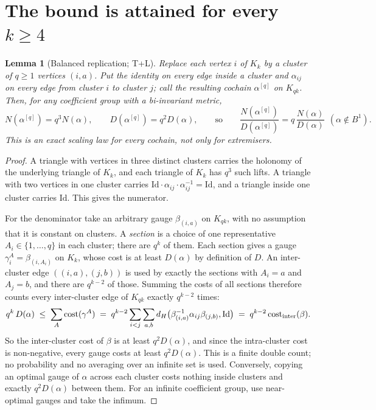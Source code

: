 \documentclass[11pt]{article}
\newtheorem{lemma}[theorem]{Lemma}
\theoremstyle{remark}\newtheorem{remark}[theorem]{Remark}
\newcommand{\Id}{\mathrm{Id}}\newcommand{\Tr}{\operatorname{Tr}}
\begin{document}
\section{The bound is attained for every \texorpdfstring{$k\ge4$}{k>=4}}\label{sec:all}
\begin{lemma}[Balanced replication; T+L]\label{lem:rep}
Replace each vertex $i$ of $K_k$ by a cluster of $q\ge1$ vertices $(i,a)$. Put the identity on every edge inside a cluster and $\alpha_{ij}$ on every edge from cluster $i$ to cluster $j$; call the resulting cochain $\alpha^{[q]}$ on $K_{qk}$. Then, for any coefficient group with a bi-invariant metric,
\[
N(\alpha^{[q]})=q^3N(\alpha),\qquad D(\alpha^{[q]})=q^2D(\alpha),\qquad\text{so}\qquad \frac{N(\alpha^{[q]})}{D(\alpha^{[q]})}=q\,\frac{N(\alpha)}{D(\alpha)}\ \ (\alpha\notin B^1).
\]
This is an exact scaling law for every cochain, not only for extremisers.
\end{lemma}
\begin{proof}
A triangle with vertices in three distinct clusters carries the holonomy of the underlying triangle of $K_k$, and each triangle of $K_k$ has $q^3$ such lifts. A triangle with two vertices in one cluster carries $\Id\cdot\alpha_{ij}\cdot\alpha_{ij}^{-1}=\Id$, and a triangle inside one cluster carries $\Id$. This gives the numerator.

For the denominator take an arbitrary gauge $\beta_{(i,a)}$ on $K_{qk}$, with no assumption that it is constant on clusters. A \emph{section} is a choice of one representative $A_i\in\{1,\dots,q\}$ in each cluster; there are $q^k$ of them. Each section gives a gauge $\gamma^A_i=\beta_{(i,A_i)}$ on $K_k$, whose cost is at least $D(\alpha)$ by definition of $D$. An inter-cluster edge $((i,a),(j,b))$ is used by exactly the sections with $A_i=a$ and $A_j=b$, and there are $q^{k-2}$ of those. Summing the costs of all sections therefore counts every inter-cluster edge of $K_{qk}$ exactly $q^{k-2}$ times:
\[
q^k\,D(\alpha)\;\le\;\sum_{A}\mathrm{cost}(\gamma^A)\;=\;q^{k-2}\sum_{i<j}\sum_{a,b}\dH\big(\beta_{(i,a)}^{-1}\alpha_{ij}\beta_{(j,b)},\Id\big)\;=\;q^{k-2}\,\mathrm{cost}_{\rm inter}(\beta).
\]
So the inter-cluster cost of $\beta$ is at least $q^2D(\alpha)$, and since the intra-cluster cost is non-negative, every gauge costs at least $q^2D(\alpha)$. This is a finite double count; no probability and no averaging over an infinite set is used. Conversely, copying an optimal gauge of $\alpha$ across each cluster costs nothing inside clusters and exactly $q^2D(\alpha)$ between them. For an infinite coefficient group, use near-optimal gauges and take the infimum.
\end{proof}
\end{document}
